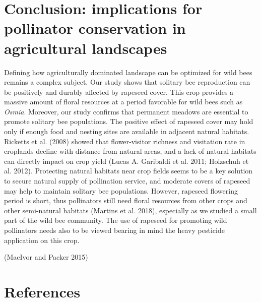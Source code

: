 \documentclass[smallextended]{svjour3}       %
\begin{document}
\hypertarget{conclusion-implications-for-pollinator-conservation-in-agricultural-landscapes}{%
\section{Conclusion: implications for pollinator conservation in
agricultural
landscapes}\label{conclusion-implications-for-pollinator-conservation-in-agricultural-landscapes}}

Defining how agriculturally dominated landscape can be optimized for
wild bees remains a complex subject. Our study shows that solitary bee
reproduction can be positively and durably affected by rapeseed cover.
This crop provides a massive amount of floral resources at a period
favorable for wild bees such as \emph{Osmia}. Moreover, our study
confirms that permanent meadows are essential to promote solitary bee
populations. The positive effect of rapeseed cover may hold only if
enough food and nesting sites are available in adjacent natural
habitats. Ricketts et al. (2008) showed that flower‐visitor richness and
visitation rate in croplands decline with distance from natural areas,
and a lack of natural habitats can directly impact on crop yield (Lucas
A. Garibaldi et al. 2011; Holzschuh et al. 2012). Protecting natural
habitats near crop fields seems to be a key solution to secure natural
supply of pollination service, and moderate covers of rapeseed may help
to maintain solitary bee populations. However, rapeseed flowering period
is short, thus pollinators still need floral resources from other crops
and other semi-natural habitats (Martins et al. 2018), especially as we
studied a small part of the wild bee community. The use of rapeseed for
promoting wild pollinators needs also to be viewed bearing in mind the
heavy pesticide application on this crop.

(MacIvor and Packer 2015)

\hypertarget{references}{%
\section{References}\label{references}}
\end{document}
